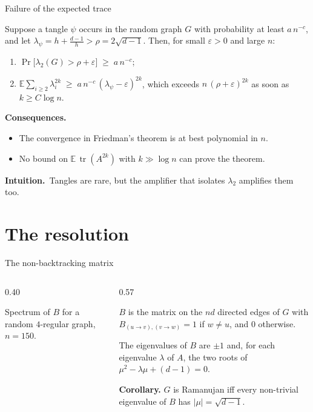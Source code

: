 \documentclass[aspectratio=169,10pt]{beamer}
\DeclareMathOperator{\tr}{tr}
\newcommand{\edge}{2\sqrt{d-1}}
\newcommand{\eps}{\varepsilon}
\newcommand{\E}{\mathbb{E}}
\newcommand{\intuition}{{\color{accent}\textbf{Intuition.}}\ }
\begin{document}
\begin{frame}{Failure of the expected trace}
  \begin{corollary}
    Suppose a tangle $\psi$ occurs in the random graph $G$ with probability at least $a\,n^{-c}$, and let
    $\lambda_\psi=h+\frac{d-1}{h}>\rho=\edge$. Then, for small $\eps>0$ and large $n$:
    \begin{enumerate}
      \item $\Pr\bigl[\lambda_2(G)>\rho+\eps\bigr]\;\ge\;a\,n^{-c}$;
      \item $\E\sum_{i\ge2}\lambda_i^{2k}\;\ge\;a\,n^{-c}\,(\lambda_\psi-\eps)^{2k}$, which exceeds
            $n\,(\rho+\eps)^{2k}$ as soon as $k\ge C\log n$.
    \end{enumerate}
  \end{corollary}
  \vspace{1mm}
  \textbf{Consequences.}
  \begin{itemize}
    \item The convergence in Friedman's theorem is at best polynomial in $n$.
    \item No bound on $\E\,\tr(A^{2k})$ with $k\gg\log n$ can prove the theorem.
  \end{itemize}
  \intuition Tangles are rare, but the amplifier that isolates $\lambda_2$ amplifies them too.
\end{frame}

\section{The resolution}

\begin{frame}{The non-backtracking matrix}
  \begin{columns}[c,onlytextwidth]
    \begin{column}{0.40\textwidth}
      \centering
      

      {\scriptsize\color{black!60} Spectrum of $B$ for a random $4$-regular graph, $n=150$.}
    \end{column}
    \begin{column}{0.57\textwidth}
      \begin{definition}
        $B$ is the matrix on the $nd$ directed edges of $G$ with $B_{(u\to v),(v\to w)}=1$ if $w\neq u$, and $0$ otherwise.
      \end{definition}
      \begin{theorem}
        The eigenvalues of $B$ are $\pm1$ and, for each eigenvalue $\lambda$ of $A$, the two roots of
        $\mu^2-\lambda\mu+(d-1)=0$.
      \end{theorem}
      \textbf{Corollary.} $G$ is Ramanujan iff every non-trivial eigenvalue of $B$ has $|\mu|=\sqrt{d-1}$.
    \end{column}
  \end{columns}
\end{frame}
\end{document}
